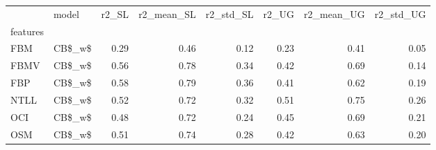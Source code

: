 \begin{tabular}{llrrrrrr}
\toprule
{} &   model &  r2\_SL &  r2\_mean\_SL &  r2\_std\_SL &  r2\_UG &  r2\_mean\_UG &  r2\_std\_UG \\
features &         &        &             &            &        &             &            \\
\midrule
FBM      &  CB\$\_w\$ &   0.29 &        0.46 &       0.12 &   0.23 &        0.41 &       0.05 \\
FBMV     &  CB\$\_w\$ &   0.56 &        0.78 &       0.34 &   0.42 &        0.69 &       0.14 \\
FBP      &  CB\$\_w\$ &   0.58 &        0.79 &       0.36 &   0.41 &        0.62 &       0.19 \\
NTLL     &  CB\$\_w\$ &   0.52 &        0.72 &       0.32 &   0.51 &        0.75 &       0.26 \\
OCI      &  CB\$\_w\$ &   0.48 &        0.72 &       0.24 &   0.45 &        0.69 &       0.21 \\
OSM      &  CB\$\_w\$ &   0.51 &        0.74 &       0.28 &   0.42 &        0.63 &       0.20 \\
\bottomrule
\end{tabular}
